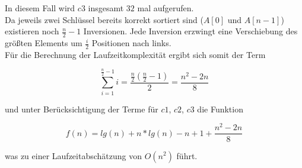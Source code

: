 In diesem Fall wird $c3$ insgesamt $32$ mal aufgerufen.
\\
Da jeweils zwei Schlüssel bereits korrekt sortiert sind ($A[0]$ und $A[n-1]$) existieren noch $\frac{n}{2} - 1$ Inversionen.
Jede Inversion erzwingt eine Verschiebung des größten Elements um $\frac{i}{2}$ Positionen nach links.
\\
Für die Berechnung der Laufzeitkomplexität ergibt sich somit der Term

\begin{equation}
    \sum_{i=1}^{\frac{n}{2} - 1} i = \frac{\frac{n}{2}(\frac{n}{2} - 1)}{2} = \frac{n^2 - 2n}{8}
\end{equation}

und unter Berücksichtigung der Terme für $c1$, $c2$, $c3$ die Funktion

\begin{equation}
    f(n) = lg(n) + n * lg(n) - n + 1 +  \frac{n^2 - 2n}{8}
\end{equation}

was zu einer Laufzeitabschätzung von $O(n^2)$ führt.